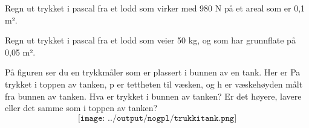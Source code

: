 \documentclass[12pt,a4paper]{article}
\def\oppgave{
		}
\begin{document}
\vskip 5pt 
\vskip 2.5pt 
\oppgave{}%
\vskip 2.5pt 
Regn ut trykket i pascal fra et lodd som virker med 980 N på et areal som er 0,1 m².
\vskip 5pt 
\vskip 2.5pt 
\oppgave{}%
\vskip 2.5pt 
Regn ut trykket i pascal fra et lodd som veier 50 kg, og som har grunnflate på 0,05 m².

\vskip 5pt 
\vskip 2.5pt 
\oppgave{}%
\vskip 2.5pt 
På figuren ser du en trykkmåler som er plassert i bunnen av en tank. Her er Pa trykket i toppen av tanken, p er tettheten til væsken, og h er væskehøyden målt fra bunnen av tanken. Hva er trykket i bunnen av tanken? Er det høyere, lavere eller det samme som i toppen av tanken?\\

$$\texttt{[image: ../output/nogpl/trukkitank.png]}$$
\vskip 5pt 
\vskip 2.5pt 
\end{document}
